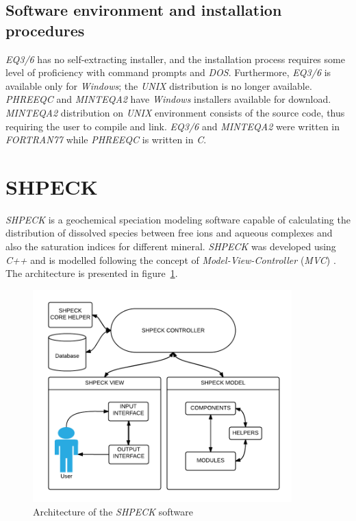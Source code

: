 \documentclass[preprint,12pt,3p]{elsarticle}
\begin{document}
\subsection{Software environment and installation procedures}
\emph{EQ3/6} has no self-extracting installer, and the installation process requires some level of proficiency with command prompts and \emph{DOS}. Furthermore, \emph{EQ3/6} is available only for \emph{Windows}; the \emph{UNIX} distribution is no longer available. \emph{PHREEQC} and \emph{MINTEQA2} have \emph{Windows} installers available for download.  \emph{MINTEQA2} distribution on \emph{UNIX} environment consists of the source code, thus requiring the user to compile and link.
\emph{EQ3/6} and \emph{MINTEQA2} were written in \emph{FORTRAN77} while \emph{PHREEQC} is written in \emph{C}.

\section{SHPECK}
\emph{SHPECK} is a geochemical speciation modeling software capable of calculating the distribution of dissolved species between free ions and aqueous complexes and also the saturation indices for different mineral. \emph{SHPECK} was developed using \emph{C++} and is modelled following the concept of \emph{Model-View-Controller} (\emph{MVC}) \cite{Gamma:94}. The architecture is presented in figure~\ref{fig:shpeck-architecture}.

\begin{figure}[ht!]
\centering
\includegraphics[width=100mm]{shpeck-architecture.png}
\caption{Architecture of the \emph{SHPECK} software}
\label{fig:shpeck-architecture}
\end{figure}
\end{document}
